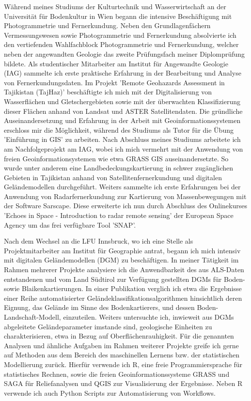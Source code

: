 \documentclass[11pt,a4paper,sans]{moderncv}        %
\begin{document}
W\"ahrend  meines Studiums der Kulturtechnik und Wasserwirtschaft an der Universit\"{a}t f\"{u}r Bodenkultur in Wien begann die intensive Besch\"{a}ftigung mit Photogrammetrie und Fernerkundung. Neben den  Grundlagenf\"{a}chern Vermessungswesen sowie Photogrammetrie und Fernerkundung absolvierte ich den vertiefenden Wahlfachblock Photogrammetrie und Fernerkundung, welcher neben der angewandten Geologie das zweite Pr\"{u}fungsfach meiner Diplompr\"{u}fung bildete. Als studentischer Mitarbeiter am Institut f\"{u}r Angewandte Geologie (IAG) sammelte ich erste praktische Erfahrung in der Bearbeitung und Analyse von Fernerkundungsdaten. Im Projekt 'Remote Geohazards Assessment in Tajikistan (TajHaz)' besch\"{a}ftigte ich mich mit der Digitalisierung von Wasserfl\"achen und Gletschergebieten sowie mit der \"uberwachten Klassifizierung dieser Fl\"achen anhand von Landsat und ASTER Satellitendaten. Die gr\"undliche Auseinandersetzung und Erfahrung in der Arbeit mit Geoinformationssystemen erschloss mir die M\"oglichkeit, w\"ahrend des Studiums als Tutor f\"{u}r die \"{U}bung 'Einf\"uhrung in GIS' zu arbeiten. Nach Abschluss meines Studiums arbeitete ich am Nachfolgeprojekt am IAG, wobei ich mich vermehrt mit der Anwendung von freien Geoinformationsystemen wie etwa GRASS GIS auseinandersetzte. So wurde unter anderem eine Landbedeckungskartierung in schwer zug\"anglichen Gebieten in Tajikistan anhand von Satellitenfernerkundung und digitalen Gel\"andemodellen durchgef\"uhrt.  Weiters sammelte ich erste Erfahrungen bei der Anwendung von Radarfernerkundung zur Kartierung von Massenbewegungen mit der Software Sarscape.  Diese erweiterte ich nun durch Abschluss des Onlinekurses 'Echoes in Space - Introduction to radar remote sensing' der European Space Agency um das frei verf\"ugbare Tool 'SNAP'.

Nach dem Wechsel an die LFU Innsbruck, wo ich eine Stelle als Projektmitarbeiter am Institut f\"{u}r Geographie antrat, begann ich mich intensiv mit digitalen Gel\"andemodellen (DGM) zu besch\"aftigen. In meiner T\"{a}tigkeit im Rahmen mehrerer Projekte analysiere ich die Anwendbarkeit des aus ALS-Daten entstandenen und vom Land S\"udtirol zur Verf\"{u}gung gestellten DGMs f\"ur Boden- sowie Blaikenkartierungen. In einer Publikation verglich ich etwa die Ergebnisse einer Reihe automatisierter Gel\"{a}ndeklassifikationsalgorithmen hinsichtlich deren Eignung, das Gel\"{a}nde im Sinne des Bodenkartierers, und dessen Boden-Landschaft-Modell, einzuteilen. Weiters untersuchte ich, inwieweit aus DGMs abgeleitete Gel\"{a}ndeparameter imstande sind, geologische Einheiten zu charakterisieren, etwa in Bezug auf Oberfl\"{a}chenrauhigkeit. F\"{u}r die genannten Analysen und \"{a}hnliche Aufgaben im Rahmen weiterer Projekte greife ich gerne auf Methoden aus dem Bereich des maschinellen Lernens bzw. der statistischen Modellierung zur\"{u}ck. Hierf\"{u}r verwende ich R, eine freie Programmiersprache f\"{u}r statistisches Rechnen, sowie die freien Geoinformationssysteme  GRASS und SAGA f\"ur Reliefanalysen und QGIS zur Visualisierung der Ergebnisse. Neben R  verwende ich auch Python Scripts zur Automatisierung von Workflows.
\end{document}
